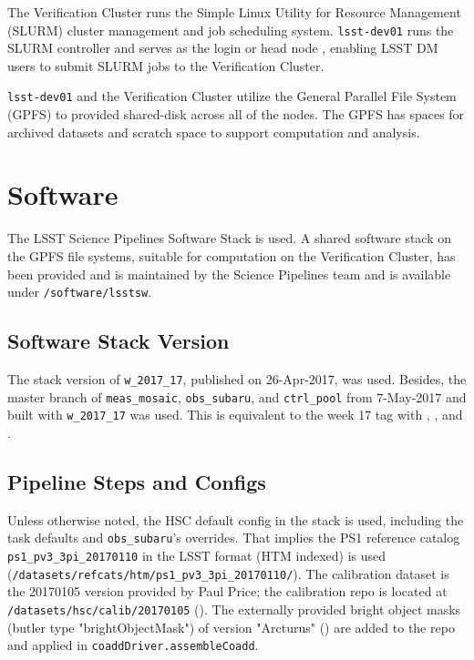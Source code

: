 \documentclass[DM,authoryear,toc]{lsstdoc}
\begin{document}
The Verification Cluster runs the Simple Linux Utility for Resource Management (SLURM) cluster management and job scheduling system. \texttt{lsst-dev01} runs the SLURM controller and serves as the login or head node , enabling LSST DM users to submit SLURM jobs to the Verification Cluster.

\texttt{lsst-dev01} and the Verification Cluster utilize the General Parallel File System (GPFS) to provided shared-disk across all of the nodes. The GPFS has spaces for archived datasets and scratch space to support computation and analysis.



\section{Software}

The LSST Science Pipelines Software Stack is used. A shared software stack on the GPFS file systems, suitable for computation on the Verification Cluster, has been provided and is maintained by the Science Pipelines team and is available under \texttt{/software/lsstsw}.

\subsection{Software Stack Version} \label{stackVersion}

The stack version of \texttt{w{\_}2017{\_}17}, published on 26-Apr-2017, was used.
Besides, the master branch of \texttt{meas{\_}mosaic}, \texttt{obs{\_}subaru}, and \texttt{ctrl{\_}pool} from 7-May-2017 and built with \texttt{w{\_}2017{\_}17} was used.
This is equivalent to the week 17 tag with , , and .

\subsection{Pipeline Steps and Configs}

Unless otherwise noted, the HSC default config in the stack is used, including the task defaults and \texttt{obs{\_}subaru}'s overrides.
That implies the PS1 reference catalog \texttt{ps1{\_}pv3{\_}3pi{\_}20170110} in the LSST format (HTM indexed) is used (\texttt{/datasets/refcats/htm/ps1{\_}pv3{\_}3pi{\_}20170110/}).
The calibration dataset is the 20170105 version provided by Paul Price; the calibration repo is located at \texttt{/datasets/hsc/calib/20170105} ().
The externally provided bright object masks (butler type "brightObjectMask") of version "Arcturus" () are added to the repo and applied in \texttt{coaddDriver.assembleCoadd}.
\end{document}
